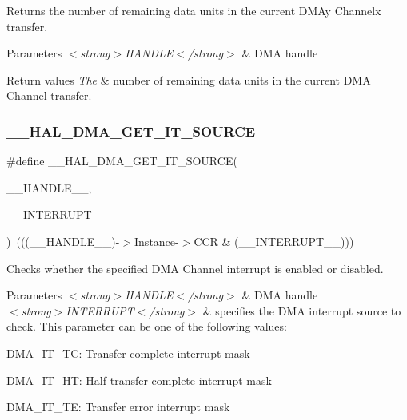 Returns the number of remaining data units in the current D\+M\+Ay Channelx transfer. 


\begin{DoxyParams}{Parameters}
{\em $<$strong$>$\+H\+A\+N\+D\+L\+E$<$/strong$>$} & D\+MA handle\\
\hline
\end{DoxyParams}

\begin{DoxyRetVals}{Return values}
{\em The} & number of remaining data units in the current D\+MA Channel transfer. \\
\hline
\end{DoxyRetVals}
\mbox{\label{group___d_m_a___exported___macros_ga206f24e6bee4600515b9b6b1ec79365b}} 
\subsubsection{\texorpdfstring{\+\_\+\+\_\+\+H\+A\+L\+\_\+\+D\+M\+A\+\_\+\+G\+E\+T\+\_\+\+I\+T\+\_\+\+S\+O\+U\+R\+CE}{\_\_HAL\_DMA\_GET\_IT\_SOURCE}}
{\footnotesize\ttfamily \#define \+\_\+\+\_\+\+H\+A\+L\+\_\+\+D\+M\+A\+\_\+\+G\+E\+T\+\_\+\+I\+T\+\_\+\+S\+O\+U\+R\+CE(\begin{DoxyParamCaption}\item[{}]{\+\_\+\+\_\+\+H\+A\+N\+D\+L\+E\+\_\+\+\_\+,  }\item[{}]{\+\_\+\+\_\+\+I\+N\+T\+E\+R\+R\+U\+P\+T\+\_\+\+\_\+ }\end{DoxyParamCaption})~(((\+\_\+\+\_\+\+H\+A\+N\+D\+L\+E\+\_\+\+\_\+)-\/$>$Instance-\/$>$C\+CR \& (\+\_\+\+\_\+\+I\+N\+T\+E\+R\+R\+U\+P\+T\+\_\+\+\_\+)))}



Checks whether the specified D\+MA Channel interrupt is enabled or disabled. 


\begin{DoxyParams}{Parameters}
{\em $<$strong$>$\+H\+A\+N\+D\+L\+E$<$/strong$>$} & D\+MA handle \\
\hline
{\em $<$strong$>$\+I\+N\+T\+E\+R\+R\+U\+P\+T$<$/strong$>$} & specifies the D\+MA interrupt source to check. This parameter can be one of the following values\+: \begin{DoxyItemize}
\item D\+M\+A\+\_\+\+I\+T\+\_\+\+TC\+: Transfer complete interrupt mask \item D\+M\+A\+\_\+\+I\+T\+\_\+\+HT\+: Half transfer complete interrupt mask \item D\+M\+A\+\_\+\+I\+T\+\_\+\+TE\+: Transfer error interrupt mask \end{DoxyItemize}
\\
\hline
\end{DoxyParams}

